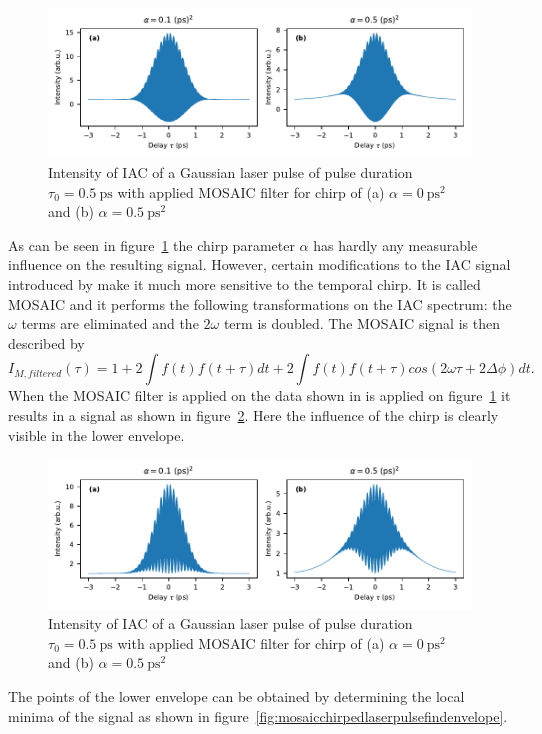 \begin{figure}[H]
	\centering
	\includegraphics[width=\linewidth]{figures/chirp/plots/I_M_gauss_chirp_without_slit_without_MOSAIC}
	\caption{Intensity of IAC of a Gaussian laser pulse of pulse duration $\tau_0=\SI{0.5}{\pico \second}$ with applied MOSAIC filter for chirp of (a) $\alpha = \SI{0}{\pico \second \squared}$ and (b) $\alpha = \SI{0.5}{\pico \second \squared}$}
	\label{fig:imgausschirpwithoutslitwithoutmosaic}
\end{figure}


As can be seen in figure~\ref{fig:imgausschirpwithoutslitwithoutmosaic} the chirp parameter $\alpha$ has hardly any measurable influence on the resulting signal.
However, certain modifications to the \ac{IAC} signal introduced by \textcite{hirayama_real-time_2002} make it much more sensitive to the temporal chirp.
It is called \ac{MOSAIC} and it performs the following transformations on the \ac{IAC} spectrum: the $\omega$ terms are eliminated and the $2\omega$ term is doubled.
The \ac{MOSAIC} signal is then described by
\begin{equation}
\label{eq:i-m-filtered}
I_{M, filtered}(\tau) = 1 + 2 \int f(t) f(t + \tau) dt + 2 \int f(t) f(t + \tau) cos(2\omega \tau + 2\Delta \phi) dt.
\end{equation}
When the MOSAIC filter is applied on the data shown in is applied on figure~\ref{fig:imgausschirpwithoutslitwithoutmosaic} it results in a signal as shown in figure~\ref{fig:mosaicchirpedlaserpulse}.
Here the influence of the chirp is clearly visible in the lower envelope.
\begin{figure}[H]
	\centering
	\includegraphics[width=\linewidth]{figures/chirp/plots/mosaic_chirped_laser_pulse}
	\caption{Intensity of IAC of a Gaussian laser pulse of pulse duration $\tau_0=\SI{0.5}{\pico \second}$ with applied MOSAIC filter for chirp of (a) $\alpha = \SI{0}{\pico \second \squared}$ and (b) $\alpha = \SI{0.5}{\pico \second \squared}$}
	\label{fig:mosaicchirpedlaserpulse}
\end{figure}
The points of the lower envelope can be obtained by determining the local minima of the signal as shown in figure~\ref{fig:mosaicchirpedlaserpulsefindenvelope}.

